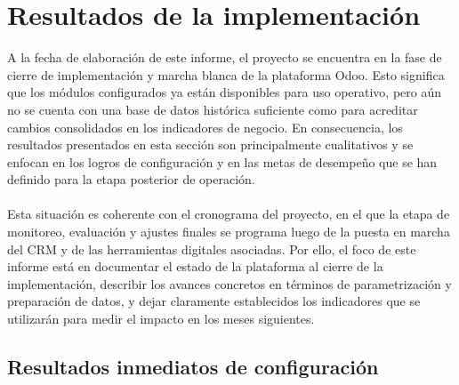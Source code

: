 \section{Resultados de la implementación}

A la fecha de elaboración de este informe, el proyecto se encuentra en la fase de cierre de implementación y marcha blanca de la plataforma Odoo. Esto significa que los módulos configurados ya están disponibles para uso operativo, pero aún no se cuenta con una base de datos histórica suficiente como para acreditar cambios consolidados en los indicadores de negocio. En consecuencia, los resultados presentados en esta sección son principalmente cualitativos y se enfocan en los logros de configuración y en las metas de desempeño que se han definido para la etapa posterior de operación.
\\
\\
Esta situación es coherente con el cronograma del proyecto, en el que la etapa de monitoreo, evaluación y ajustes finales se programa luego de la puesta en marcha del CRM y de las herramientas digitales asociadas. Por ello, el foco de este informe está en documentar el estado de la plataforma al cierre de la implementación, describir los avances concretos en términos de parametrización y preparación de datos, y dejar claramente establecidos los indicadores que se utilizarán para medir el impacto en los meses siguientes.

\subsection{Resultados inmediatos de configuración}

